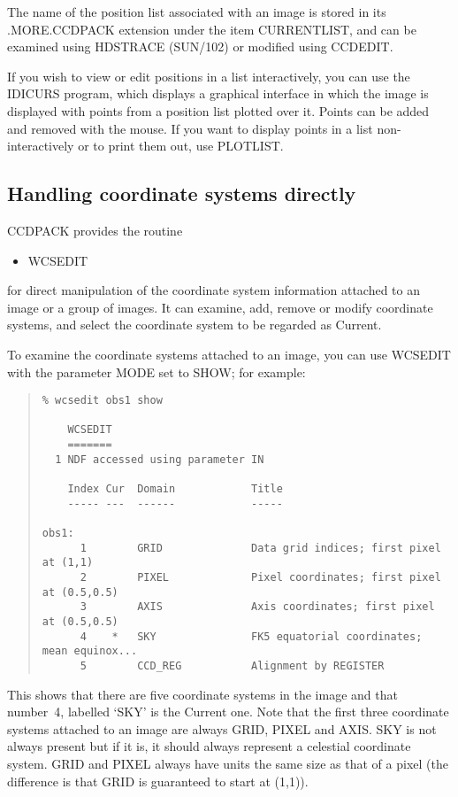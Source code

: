 \documentclass[twoside,11pt]{article}
\newcommand{\htmlref}[2]{#1}
\newcommand{\latexhtml}[2]{#1}
\newcommand{\xref}[3]{#1}
\newcommand{\xlabel}[1]{}
\renewcommand{\_}{\texttt{\symbol{95}}}
\newcommand{\ttsize}{\latexhtml{\small}{}}
\newenvironment{myquote}{\begin{quote}\ttsize}{\end{quote}}
\newcommand{\routine}[1]{{\sc #1}}
\newcommand{\xroutine}[1]{\htmlref{{\sc #1}}{#1}}
\begin{document}
The name of the position list associated with an image is stored
in its .MORE.CCDPACK extension under the item CURRENT\_LIST, and
can be examined using \xref{HDSTRACE (SUN/102)}{sun102}{}
or modified using \xroutine{CCDEDIT}.

If you wish to view or edit positions in a list interactively, 
you can use the \xroutine{IDICURS} program, which displays a 
graphical interface in
which the image is displayed with points from a position list 
plotted over it.  Points can be added and removed with the mouse.
If you want to display points in a list non-interactively or
to print them out, use \xroutine{PLOTLIST}.


\subsection{\xlabel{wcsdirect}\label{wcsdirect}Handling coordinate systems
            directly}

CCDPACK provides the routine
\begin{itemize}
\item \xroutine{WCSEDIT}
\end{itemize}
for direct manipulation of the coordinate system information attached
to an image or a group of images.
It can examine, add, remove or modify coordinate systems, 
and select the coordinate system to be regarded as Current.

To examine the coordinate systems attached to an image, you
can use \routine{WCSEDIT} with the parameter MODE set to SHOW;
for example:
\begin{myquote}
\begin{verbatim}
% wcsedit obs1 show

    WCSEDIT
    =======
  1 NDF accessed using parameter IN

    Index Cur  Domain            Title
    ----- ---  ------            -----

obs1:
      1        GRID              Data grid indices; first pixel at (1,1)
      2        PIXEL             Pixel coordinates; first pixel at (0.5,0.5)
      3        AXIS              Axis coordinates; first pixel at (0.5,0.5)
      4    *   SKY               FK5 equatorial coordinates; mean equinox...
      5        CCD_REG           Alignment by REGISTER
\end{verbatim}
\end{myquote}
This shows that there are five coordinate systems in the image and
that number~4, labelled `SKY' is the Current one.
Note that the first three coordinate systems attached to an image
are always GRID, PIXEL and AXIS.  
SKY is not always present but if it is, it should always represent 
a celestial coordinate system.
GRID and PIXEL always have units the same size as that of a pixel
(the difference is that GRID is guaranteed to start at (1,1)). 
\end{document}
